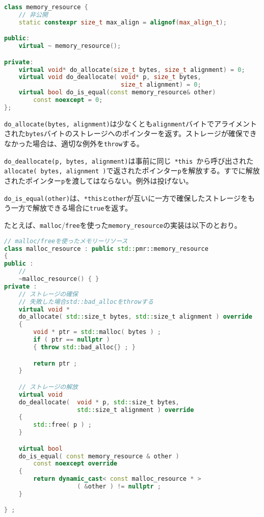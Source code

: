 \begin{lstlisting}[language=C++]
class memory_resource {
    // 非公開
    static constexpr size_t max_align = alignof(max_align_t);

public:
    virtual ~ memory_resource();

private:
    virtual void* do_allocate(size_t bytes, size_t alignment) = 0;
    virtual void do_deallocate( void* p, size_t bytes,
                                size_t alignment) = 0;
    virtual bool do_is_equal(const memory_resource& other)
        const noexcept = 0;
};
\end{lstlisting}

\lstinline!do_allocate(bytes, alignment)!は少なくとも\lstinline!alignment!バイトでアライメントされた\lstinline!bytes!バイトのストレージへのポインターを返す。ストレージが確保できなかった場合は、適切な例外を\lstinline!throw!する。

\lstinline!do_deallocate(p, bytes, alignment)!は事前に同じ~\lstinline!*this!~から呼び出された\lstinline!allocate( bytes, alignment )!で返されたポインター\lstinline!p!を解放する。すでに解放されたポインター\lstinline!p!を渡してはならない。例外は投げない。

\lstinline!do_is_equal(other)!は、\lstinline!*thisとother!が互いに一方で確保したストレージをもう一方で解放できる場合に\lstinline!true!を返す。

たとえば、\lstinline!malloc!/\lstinline!free!を使った\lstinline!memory_resource!の実装は以下のとおり。

\begin{lstlisting}[language=C++]
// malloc/freeを使ったメモリーリソース
class malloc_resource : public std::pmr::memory_resource
{
public :
    //
    ~malloc_resource() { }
private :
    // ストレージの確保
    // 失敗した場合std::bad_allocをthrowする
    virtual void * 
    do_allocate( std::size_t bytes, std::size_t alignment ) override
    {
        void * ptr = std::malloc( bytes ) ;
        if ( ptr == nullptr )
        { throw std::bad_alloc{} ; }

        return ptr ;
    }

    // ストレージの解放
    virtual void 
    do_deallocate(  void * p, std::size_t bytes, 
                    std::size_t alignment ) override
    {
        std::free( p ) ;
    }

    virtual bool 
    do_is_equal( const memory_resource & other )
        const noexcept override
    {
        return dynamic_cast< const malloc_resource * >
                    ( &other ) != nullptr ;
    }

} ;
\end{lstlisting}

